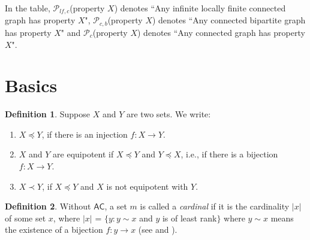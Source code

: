 \documentclass[12pt,reqno,a4paper]{amsart}
\theoremstyle{definition}
\newtheorem{defn}{Definition}[section]
\begin{document}
	In the table, $\mathcal{P}_{lf,c}$(property $X$) denotes ``Any infinite locally finite connected graph has property $X$", $\mathcal{P}_{c,b}$(property $X$)
	denotes ``Any connected bipartite graph has property $X$" and $\mathcal{P}_{c}$(property $X$)
	denotes ``Any connected graph has property $X$".
	
	
	
	\section{Basics}
	\begin{defn}
		Suppose $X$ and $Y$ are two sets. We write:
		
		\begin{enumerate}
			\item $X \preceq Y$, if there is an injection $f : X \rightarrow Y$.
			\item $X$ and $Y$ are equipotent if $X \preceq Y$ and $Y \preceq X$, i.e., if there is a bijection $f : X \rightarrow Y$.
			\item $X \prec Y$, if $X \preceq Y$ and $X$ is not equipotent with $Y$.
		\end{enumerate}
	\end{defn}
	
	\begin{defn}
		Without $\mathsf{AC}$, a set $m$ is called a {\em cardinal} if it is the cardinality $\vert x\vert$ of some set $x$, where 
		$\vert x\vert$ = $\{y : y \sim x$ and $y$ is of least rank$\}$ where $y \sim x$ means the
		existence of a bijection $f : y \rightarrow x$ 
		(see \cite[Definition 2.2, p. 83]{Lev2002} and \cite[Section 11.2]{Jec1973}).
	\end{defn}
	
\end{document}
